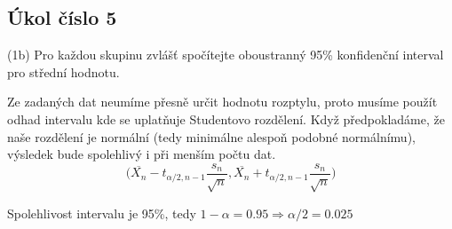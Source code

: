 \documentclass[paper=a4, fontsize=12pt]{scrartcl}
\numberwithin{equation}{section}		%
\numberwithin{figure}{section}			%
\numberwithin{table}{section}				%
\begin{document}
\subsection{Úkol číslo 5}
(1b) Pro každou skupinu zvlášť spočítejte oboustranný 95\% konfidenční interval pro střední hodnotu.
\newline\par
Ze zadaných dat neumíme přesně určit hodnotu rozptylu, proto musíme použít odhad intervalu kde se uplatňuje Studentovo rozdělení. Když předpokladáme, že naše rozdělení je normální (tedy minimálne alespoň podobné normálnímu), výsledek bude spolehlivý i při menším počtu dat. 
\[ 
\bigg(\overline{X_n} - t_{\alpha/2,n-1}\frac{s_n}{\sqrt{n}},
 \overline{X_n} + t_{\alpha/2,n-1}\frac{s_n}{\sqrt{n}} \bigg) 
\] \par
Spolehlivost intervalu je 95\%, tedy \(1 - \alpha = 0.95 \Rightarrow \alpha/2 = 0.025\)
\end{document}
